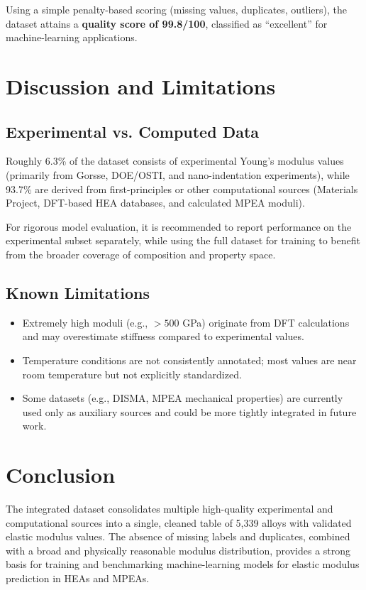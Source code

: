 \documentclass[12pt]{article}
\begin{document}
Using a simple penalty-based scoring (missing values, duplicates, outliers), the dataset attains a \textbf{quality score of 99.8/100}, classified as ``excellent'' for machine-learning applications.

\section{Discussion and Limitations}
\subsection{Experimental vs. Computed Data}
Roughly 6.3\% of the dataset consists of experimental Young's modulus values (primarily from Gorsse, DOE/OSTI, and nano-indentation experiments), while 93.7\% are derived from first-principles or other computational sources (Materials Project, DFT-based HEA databases, and calculated MPEA moduli).

For rigorous model evaluation, it is recommended to report performance on the experimental subset separately, while using the full dataset for training to benefit from the broader coverage of composition and property space.

\subsection{Known Limitations}
\begin{itemize}
  \item Extremely high moduli (e.g., $>500$ GPa) originate from DFT calculations and may overestimate stiffness compared to experimental values.
  \item Temperature conditions are not consistently annotated; most values are near room temperature but not explicitly standardized.
  \item Some datasets (e.g., DISMA, MPEA mechanical properties) are currently used only as auxiliary sources and could be more tightly integrated in future work.
\end{itemize}

\section{Conclusion}
The integrated dataset consolidates multiple high-quality experimental and computational sources into a single, cleaned table of 5,339 alloys with validated elastic modulus values. The absence of missing labels and duplicates, combined with a broad and physically reasonable modulus distribution, provides a strong basis for training and benchmarking machine-learning models for elastic modulus prediction in HEAs and MPEAs.
\end{document}
